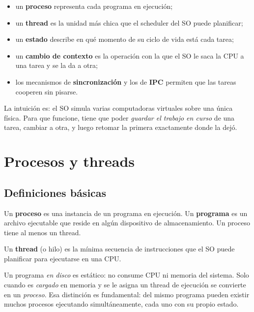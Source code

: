 \documentclass[11pt,a4paper]{article}
\begin{document}
\begin{itemize}[leftmargin=*]
    \item un \textbf{proceso} representa cada programa en ejecución;
    \item un \textbf{thread} es la unidad más chica que el scheduler
        del SO puede planificar;
    \item un \textbf{estado} describe en qué momento de su ciclo de
        vida está cada tarea;
    \item un \textbf{cambio de contexto} es la operación con la que el
        SO le saca la CPU a una tarea y se la da a otra;
    \item los mecanismos de \textbf{sincronización} y los de
        \textbf{IPC} permiten que las tareas cooperen sin pisarse.
\end{itemize}

\begin{idea}
La intuición es: el SO simula varias computadoras virtuales sobre una
única física. Para que funcione, tiene que poder \emph{guardar el
trabajo en curso} de una tarea, cambiar a otra, y luego retomar la
primera exactamente donde la dejó.
\end{idea}

\section{Procesos y threads}

\subsection{Definiciones básicas}

\begin{definicion}
Un \textbf{proceso} es una instancia de un programa en ejecución. Un
\textbf{programa} es un archivo ejecutable que reside en algún
dispositivo de almacenamiento. Un proceso tiene al menos un thread.
\end{definicion}

\begin{definicion}
Un \textbf{thread} (o hilo) es la mínima secuencia de instrucciones
que el SO puede planificar para ejecutarse en una CPU.
\end{definicion}

Un programa \emph{en disco} es estático: no consume CPU ni memoria del
sistema. Solo cuando es \emph{cargado} en memoria y se le asigna un
thread de ejecución se convierte en un \emph{proceso}. Esa distinción
es fundamental: del mismo programa pueden existir muchos procesos
ejecutando simultáneamente, cada uno con su propio estado.
\end{document}

